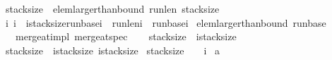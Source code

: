 \begin{isabellebody}
{\isacharparenleft}stack{\isacharunderscore}size\ {\isasymge}{}\ {\isasymlongrightarrow}elem{\isacharunderscore}larger{\isacharunderscore}than{\isacharunderscore}bound\ run{\isacharunderscore}len\ {\isacharparenleft}stack{\isacharunderscore}size{\isacharminus}{}{\isacharparenright}\ {}{\isacharparenright}\ {\isasymand}\ \isanewline
{\isacharparenleft}{\isasymforall}i{\isachardot}\ {\isacharparenleft}{\isacharparenleft}i{\isasymge}{}\ {\isasymand}\ i{\isacharless}stack{\isacharunderscore}size{\isacharminus}{}{\isacharparenright}{\isasymlongrightarrow}{\isacharparenleft}run{\isacharunderscore}base{\isacharbang}i\ {\isacharplus}\ run{\isacharunderscore}len{\isacharbang}i\ {\isacharequal}\ run{\isacharunderscore}base{\isacharbang}{\isacharparenleft}i{\isacharplus}{}{\isacharparenright}{\isacharparenright}{\isacharparenright}{\isacharparenright}\ {\isasymand}\isanewline
{\isacharparenleft}elem{\isacharunderscore}larger{\isacharunderscore}than{\isacharunderscore}bound\ run{\isacharunderscore}base\ {}\ {}{\isacharparenright}{\isachardoublequoteclose}\isanewline
\isanewline
\isanewline
{}\isamarkupfalse%
\ {\isacharparenleft}\ merge{\isacharunderscore}at{\isacharunderscore}impl{\isacharparenright}\ merge{\isacharunderscore}at{\isacharunderscore}spec{\isacharcolon}\ \isanewline
{\isachardoublequoteopen}{\isasymforall}{\isasymsigma}{\isachardot}\ {\isasymGamma}{\isasymturnstile}\ {\isasymlbrace}{\isasymsigma}{\isachardot}\isanewline
{\isacharparenleft}{\isasymacute}stack{\isacharunderscore}size{\isacharequal}{}\ {\isasymlongrightarrow}\ {\isasymacute}i{\isacharequal}{\isasymacute}stack{\isacharunderscore}size{\isacharminus}{}{\isacharparenright}\ {\isasymand}\isanewline
{\isacharparenleft}{\isasymacute}stack{\isacharunderscore}size{\isasymge}{}\ {\isasymlongrightarrow}\ {\isacharparenleft}{\isasymacute}i{\isacharequal}{\isasymacute}stack{\isacharunderscore}size{\isacharminus}{}\ {\isasymor}{\isasymacute}i{\isacharequal}{\isasymacute}stack{\isacharunderscore}size{\isacharminus}{}{\isacharparenright}{\isacharparenright}\ {\isasymand}\isanewline
{\isacharparenleft}{\isasymacute}stack{\isacharunderscore}size\ {\isachargreater}\ {}{\isacharparenright}\ {\isasymand}\ {\isacharparenleft}{\isasymacute}i{\isasymge}{}{\isacharparenright}\ {\isasymand}\isanewline
{\isacharparenleft}{\isasymacute}a\ {\isasymnoteq}\ {\isacharbrackleft}{\isacharbrackright}{\isacharparenright}\ {\isasymand}\isanewline

\end{isabellebody}
